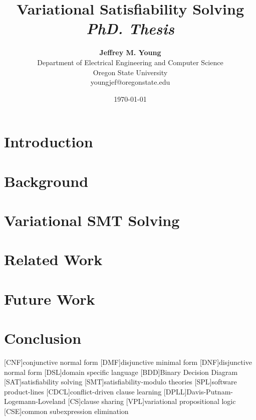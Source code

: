\documentclass[11pt]{article}
\title{{\bf Variational Satisfiability Solving} \\
\it PhD. Thesis}%
\author{{\bf Jeffrey M. Young}  \\
Department of Electrical Engineering and Computer Science \\
Oregon State University\\
{\small youngjef@oregonstate.edu}
}
\date{\today}
\begin{document}
\pagestyle{plain}
\maketitle

\begin{abstract}
  
\end{abstract}


\section{Introduction}

\section{Background}

\section{Variational SMT Solving}



\section{Related Work}

\section{Future Work}

\section{Conclusion}

\begin{acronym}[]
  [CNF]{conjunctive normal form}
  [DMF]{disjunctive minimal form}
  [DNF]{disjunctive normal form}
  [DSL]{domain specific language}
  [BDD]{Binary Decision Diagram}
  [SAT]{satisfiability solving}
  [SMT]{satisfiability-modulo theories}
  [SPL]{software product-lines}
  [CDCL]{conflict-driven clause learning}
  [DPLL]{Davis-Putnam-Logemann-Loveland}
  [CS]{clause sharing}
  [VPL]{variational propositional logic}
  [CSE]{common subexpression elimination}
\end{acronym}

\begin{footnotesize}
  
  
\end{footnotesize}
\end{document}
